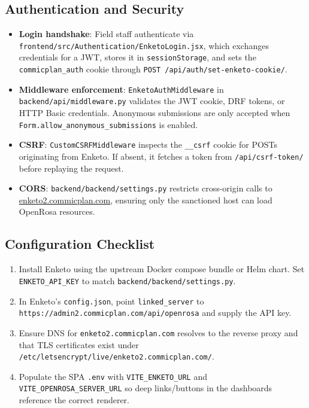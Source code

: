 \documentclass[11pt]{article}
\begin{document}
\subsection{Authentication and Security}
\begin{itemize}[leftmargin=*]
  \item \textbf{Login handshake}: Field staff authenticate via \texttt{frontend/src/Authentication/EnketoLogin.jsx}, which exchanges credentials for a JWT, stores it in \texttt{sessionStorage}, and sets the \texttt{commicplan\_auth} cookie through \verb|POST /api/auth/set-enketo-cookie/|.
  \item \textbf{Middleware enforcement}: \texttt{EnketoAuthMiddleware} in \texttt{backend/api/middleware.py} validates the JWT cookie, DRF tokens, or HTTP Basic credentials. Anonymous submissions are only accepted when \texttt{Form.allow\_anonymous\_submissions} is enabled.
  \item \textbf{CSRF}: \texttt{CustomCSRFMiddleware} inspects the \texttt{\_\_csrf} cookie for POSTs originating from Enketo. If absent, it fetches a token from \verb|/api/csrf-token/| before replaying the request.
  \item \textbf{CORS}: \texttt{backend/backend/settings.py} restricts cross-origin calls to \href{https://enketo2.commicplan.com}{enketo2.commicplan.com}, ensuring only the sanctioned host can load OpenRosa resources.
\end{itemize}

\subsection{Configuration Checklist}
\begin{enumerate}[leftmargin=*]
  \item Install Enketo using the upstream Docker compose bundle or Helm chart. Set \texttt{ENKETO\_API\_KEY} to match \texttt{backend/backend/settings.py}.
  \item In Enketo's \texttt{config.json}, point \texttt{linked\_server} to \texttt{https://admin2.commicplan.com/api/openrosa} and supply the API key.
  \item Ensure DNS for \texttt{enketo2.commicplan.com} resolves to the reverse proxy and that TLS certificates exist under \texttt{/etc/letsencrypt/live/enketo2.commicplan.com/}.
  \item Populate the SPA \texttt{.env} with \texttt{VITE\_ENKETO\_URL} and \texttt{VITE\_OPENROSA\_SERVER\_URL} so deep links/buttons in the dashboards reference the correct renderer.
\end{enumerate}
\end{document}
